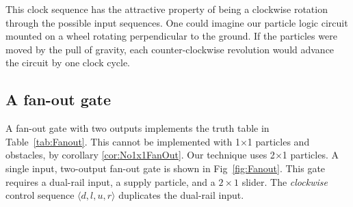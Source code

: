 \documentclass[letterpaper, 10 pt, conference]{ieeeconf}
\begin{document}
  


This clock sequence has the attractive property of being a clockwise rotation through the possible input sequences.  One could imagine our particle logic circuit mounted on a wheel rotating perpendicular to the ground. If the particles were moved by the pull of gravity, each counter-clockwise revolution would advance the circuit by one clock cycle.


  
  
  \subsection{A {\sc fan-out} gate}\label{sec:FanOut}
A {\sc fan-out} gate with two outputs implements the truth table in Table~\ref{tab:Fanout}.  
This cannot be implemented with 1$\times$1 particles and obstacles, by corollary \ref{cor:No1x1FanOut}.   Our technique uses 2$\times$1 particles.   A single input, two-output {\sc fan-out} gate is shown in Fig~\ref{fig:Fanout}.  This gate requires a dual-rail input, a supply particle, and a $2\times 1$ slider.  The  \emph{clockwise} control sequence $\langle d,l,u,r \rangle$  duplicates the dual-rail input.
\end{document}
